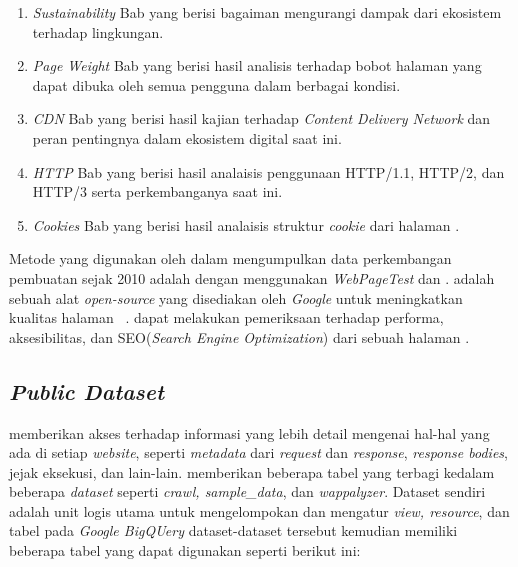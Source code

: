 \begin{enumerate}
    \item \textit{Sustainability} Bab yang berisi bagaiman mengurangi dampak dari ekosistem \web terhadap lingkungan.
    \item \textit{Page Weight} Bab yang berisi hasil analisis terhadap bobot halaman yang dapat dibuka oleh semua pengguna dalam berbagai kondisi.
    \item \textit{CDN} Bab yang berisi hasil kajian terhadap \textit{Content Delivery Network} dan peran pentingnya dalam ekosistem digital saat ini.
    \item \textit{HTTP} Bab yang berisi hasil analaisis penggunaan HTTP/1.1, HTTP/2, dan HTTP/3 serta perkembanganya saat ini.
    \item \textit{Cookies} Bab yang berisi hasil analaisis struktur \textit{cookie} dari halaman \web.
\end{enumerate}

Metode yang digunakan oleh \http dalam mengumpulkan data perkembangan pembuatan \web sejak 2010 adalah dengan menggunakan \textit{WebPageTest} dan \light. \light adalah sebuah alat \textit{open-source} yang disediakan oleh \textit{Google} untuk meningkatkan kualitas halaman \web~\cite{lighthouse}. \light dapat melakukan pemeriksaan terhadap performa, aksesibilitas, dan SEO(\textit{Search Engine Optimization}) dari sebuah halaman \web.

\subsection{\textit{Public Dataset}}
\label{subsec:pd}
\http memberikan akses terhadap informasi yang lebih detail mengenai hal-hal yang ada di setiap \textit{website}, seperti \textit{metadata} dari \textit{request} dan \textit{response}, \textit{response bodies}, jejak eksekusi, dan lain-lain. \http memberikan beberapa tabel yang terbagi kedalam beberapa \textit{dataset} seperti \textit{crawl, sample\_data}, dan \textit{wappalyzer}. Dataset sendiri adalah unit logis utama untuk mengelompokan dan mengatur \textit{view, resource}, dan tabel pada \textit{Google BigQUery} dataset-dataset tersebut kemudian memiliki beberapa tabel yang dapat digunakan seperti berikut ini:

